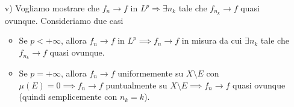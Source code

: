 \begin{enumerate}
	\item[v)] Vogliamo mostrare che $f_n \to f$ in $L^p \Rightarrow \exists n_k$ tale che $f_{n_k} \to f$ quasi ovunque. Consideriamo due casi
		\begin{itemize}
			\item Se $p < +\infty$, allora $f_n \to f$ in $L^p \implies f_n \to f$ in misura da cui $\exists n_k$ tale che $f_{n_k} \to f$ quasi ovunque.

			\item Se $p = +\infty$, allora $f_n \to f$ uniformemente su $X \setminus E$ con $\mu(E) = 0 \implies f_n \to f$ puntualmente su $X \setminus E \implies f_n \to f$ quasi ovunque (quindi semplicemente con $n_k = k$). 
		\end{itemize}

\end{enumerate}

